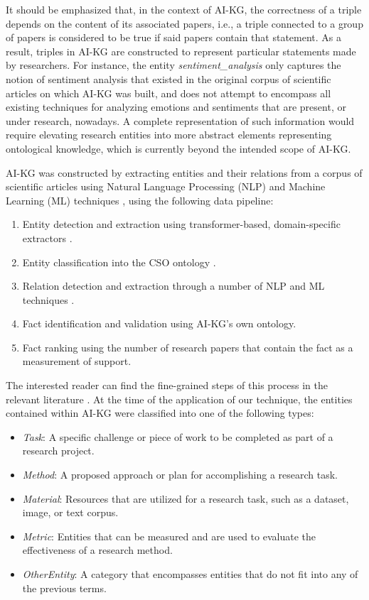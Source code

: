 It should be emphasized that, in the context of AI-KG, the correctness of a triple depends on the content of its associated papers, i.e., a triple connected to a group of papers is considered to be true if said papers contain that statement. As a result, triples in AI-KG are constructed to represent particular statements made by researchers. For instance, the entity \textit{sentiment\_analysis} only captures the notion of sentiment analysis that existed in the original corpus of scientific articles on which AI-KG was built, and does not attempt to encompass all existing techniques for analyzing emotions and sentiments that are present, or under research, nowadays. A complete representation of such information would require elevating research entities into more abstract elements representing ontological knowledge, which is currently beyond the intended scope of AI-KG.

AI-KG was constructed by extracting entities and their relations from a corpus of scientific articles using Natural Language Processing (NLP) and Machine Learning (ML) techniques \cite{dessi2021generating}, using the following data pipeline:

\begin{enumerate}
    \item Entity detection and extraction using transformer-based, domain-specific extractors \cite{wadden2019}.
    \item Entity classification into the CSO ontology \cite{salatino2019}.
    \item Relation detection and extraction through a number of NLP and ML techniques \cite{wadden2019, angeli2015,toutanova2003}.
    \item Fact identification and validation using AI-KG's own ontology.%
    \item Fact ranking using the number of research papers that contain the fact as a measurement of support.
\end{enumerate}

The interested reader can find the fine-grained steps of this process in the relevant literature \cite{dessi2020aikg,dessi2021generating}. At the time of the application of our technique, the entities contained within AI-KG were classified into one of the following types:

\begin{itemize}
    \item \textit{Task}: A specific challenge or piece of work to be completed as part of a research project.
    \item \textit{Method}: A proposed approach or plan for accomplishing a research task.
    \item \textit{Material}: Resources that are utilized for a research task, such as a dataset, image, or text corpus.
    \item \textit{Metric}: Entities that can be measured and are used to evaluate the effectiveness of a research method.
    \item \textit{OtherEntity}: A category that encompasses entities that do not fit into any of the previous terms.
\end{itemize}

